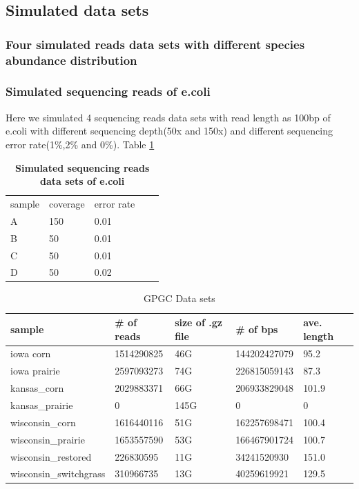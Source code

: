\documentclass{article}
\begin{document}
\subsection{Simulated data sets}

\subsubsection{Four simulated reads data sets with different species abundance distribution}

\subsubsection{Simulated sequencing reads of e.coli}

Here we simulated 4 sequencing reads data sets with read length as 100bp of e.coli with different sequencing depth(50x and 150x) and different sequencing error rate(1\%,2\% and 0\%). Table \ref{table:ecoli}

\begin{table}[h]
\caption{
\bf{Simulated sequencing reads data sets of e.coli}
}
\begin{tabular}{|l|l|l|ll}
\cline{1-3}
sample & coverage & error rate &  &  \\ \cline{1-3}
A      & 150      & 0.01       &  &  \\ \cline{1-3}
B      & 50       & 0.01       &  &  \\ \cline{1-3}
C      & 50       & 0.01       &  &  \\ \cline{1-3}
D      & 50       & 0.02       &  &  \\ \cline{1-3}
\end{tabular}
\label{table:ecoli}
\end{table}



\begin{table}[h]
\caption{GPGC Data sets}
\label{my-label}
\begin{tabular}{|l|l|l|l|l|}
\hline
sample & \# of reads & size of .gz file & \# of bps & ave. length \\ \hline
iowa corn & 1514290825 & 46G & 144202427079 & 95.2 \\ \hline
iowa prairie & 2597093273 & 74G & 226815059143 & 87.3 \\ \hline
kansas\_corn & 2029883371 & 66G & 206933829048 & 101.9 \\ \hline
kansas\_prairie & 0 & 145G & 0 & 0 \\ \hline
wisconsin\_corn & 1616440116 & 51G & 162257698471 & 100.4 \\ \hline
wisconsin\_prairie & 1653557590 & 53G & 166467901724 & 100.7 \\ \hline
wisconsin\_restored & 226830595 & 11G & 34241520930 & 151.0 \\ \hline
wisconsin\_switchgrass & 310966735 & 13G & 40259619921 & 129.5 \\ \hline
\end{tabular}
\end{table}
\end{document}
